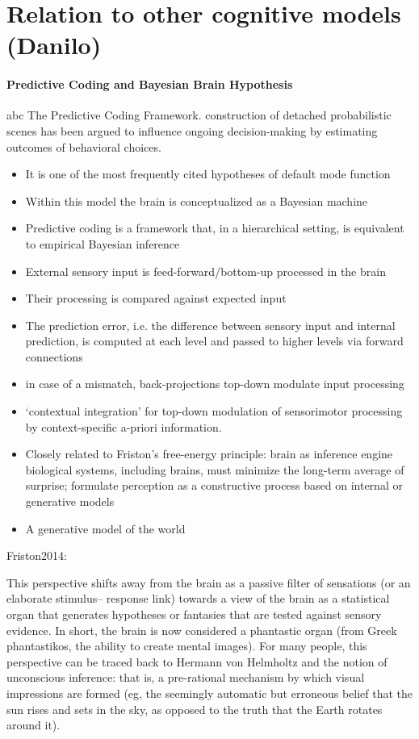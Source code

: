 \documentclass{article} %
\begin{document}
\section{Relation to other cognitive models (Danilo)}
\paragraph{Predictive Coding and Bayesian Brain Hypothesis}
abc
The Predictive Coding Framework.
construction of detached probabilistic scenes has been argued to influence ongoing decision-making by estimating outcomes of behavioral choices.

\begin{itemize}
  \item It is one of the most frequently cited hypotheses of default mode function
  \item Within this model the brain is conceptualized as a Bayesian machine
  \item Predictive coding is a framework that, in a hierarchical setting,
  is equivalent to empirical Bayesian inference
  \item External sensory input is feed-forward/bottom-up processed in the brain
  \item Their processing is compared against expected input
  \item The prediction error, i.e. the difference between sensory input
  and internal prediction, is computed at each level and passed to
  higher levels via forward connections
  \item in case of a mismatch, back-projections top-down modulate
  input processing
  \item ‘contextual integration’ for top-down modulation of sensorimotor
  processing by context-specific a-priori information.
  \item Closely related to Friston's free-energy principle: brain as inference engine
  biological systems, including brains, must minimize the long-term average of surprise;
  formulate perception as a constructive process based on internal or generative models
  \item A generative model of the world
\end{itemize}

Friston2014:

This perspective shifts away from the brain as a passive filter of sensations (or an elaborate stimulus– response link) towards a view of the brain as a statistical organ that generates hypotheses or fantasies that are tested against sensory evidence. In short, the brain is now considered a phantastic organ (from Greek phantastikos, the ability to create mental images). For many people, this perspective can be traced back to Hermann von Helmholtz and the notion of unconscious inference: that is, a pre-rational mechanism by which visual impressions are formed (eg, the seemingly automatic but erroneous belief that the sun rises and sets in the sky, as opposed to the truth that the Earth rotates around it).
\end{document}
